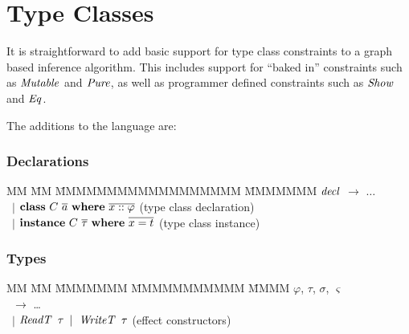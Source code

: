 
\clearpage{}
\section{Type Classes}
\label{inference:type-classes}

It is straightforward to add basic support for type class constraints to a graph based inference algorithm. This includes support for ``baked in'' constraints such as $\operatorname{\mathit{Mutable}}$ and $\operatorname{\mathit{Pure}}$, as well as programmer defined constraints such as $\operatorname{\mathit{Show}}$ and $\operatorname{\mathit{Eq}}$. 

The additions to the language are:

\vspace{-1em}
\subsubsection{Declarations}
\vspace{-1ex}
\begin{tabbing}
	MM 	\= MM \= MMMMMMMMMMMMMMMMMM \= MMMMMMM \kill
	$\operatorname{\mathit{decl}}$ \> $\to$ 	\> $\dots$ \\
		\> \ $\mid$	\> $\textrm{\textbf{class}} \ C \ \overline{a} \ \textrm{\textbf{where}} \ \overline{x :: \varphi}$  
				\> (type class declaration) \\[0.5ex]
		\> \ $\mid$	\> $\textrm{\textbf{instance}} \ C \ \overline{\tau} \ \textrm{\textbf{where}} \ \overline{x = t}$  
				\> (type class instance)
\end{tabbing}

\vspace{-2em}
\subsubsection{Types}
\vspace{-1ex}
\begin{tabbing}
	MM 	\= MM \= MMMMMMM \= MMMMMMMMMMM \= MMMM \kill
	$\varphi$, $\tau$, $\sigma$, $\varsigma$	\\
		\> \ $\to$	\> \dots \\
		\>  \ $\mid$	\> $\operatorname{\mathit{ReadT}} \ \tau$	\> $\mid \ \operatorname{\mathit{WriteT}} \ \tau$	
				\> (effect constructors)
\end{tabbing}


\vspace{-2em}
